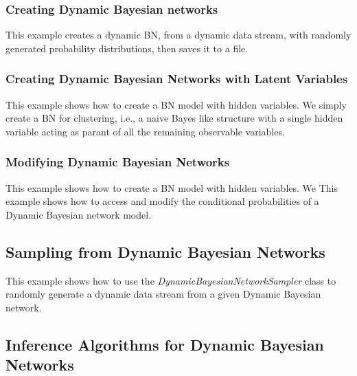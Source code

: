 \documentclass[10pt,a4paper]{article}
\begin{document}
\subsubsection{Creating Dynamic Bayesian networks}\label{sec:dbns:dbns:creating}
This example creates a dynamic BN, from a dynamic data stream, with randomly generated probability distributions, then saves it to a file.



\subsubsection{Creating Dynamic Bayesian Networks with Latent Variables}\label{sec:dbns:dbns:creatingLatent}
This example shows how to create a BN model with hidden variables. We simply create a BN for clustering, i.e., a naive Bayes like structure with a single hidden variable acting as parant of all the remaining observable variables.




\subsubsection{Modifying Dynamic Bayesian Networks}\label{sec:dbns:dbns:modif}
This example shows how to create a BN model with hidden variables. We This example shows how to access and modify the conditional probabilities of a Dynamic Bayesian network model.



\subsection{Sampling from Dynamic Bayesian Networks}\label{sec:dbns:sampling}
This example shows how to use the \textit{DynamicBayesianNetworkSampler} class to randomly generate a dynamic data stream from a given Dynamic Bayesian network.



\subsection{Inference Algorithms for Dynamic Bayesian Networks}\label{sec:dbns:inference}
\end{document}
